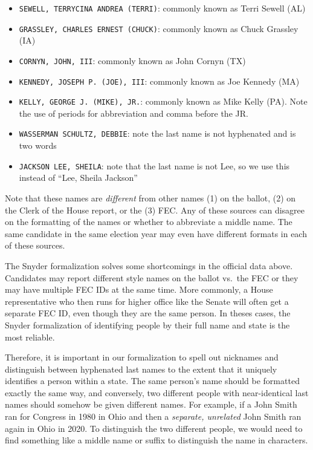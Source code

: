\documentclass[12pt]{article}
\begin{document}
\begin{itemize}
\tightlist
\item
  \texttt{SEWELL,\ TERRYCINA\ ANDREA\ (TERRI)}: commonly known as Terri
  Sewell (AL)
\item
  \texttt{GRASSLEY,\ CHARLES\ ERNEST\ (CHUCK)}: commonly known as Chuck
  Grassley (IA)
\item
  \texttt{CORNYN,\ JOHN,\ III}: commonly known as John Cornyn (TX)
\item
  \texttt{KENNEDY,\ JOSEPH\ P.\ (JOE),\ III}: commonly known as Joe
  Kennedy (MA)
\item
  \texttt{KELLY,\ GEORGE\ J.\ (MIKE),\ JR.}: commonly known as Mike
  Kelly (PA). Note the use of periods for abbreviation and comma before
  the JR.
\item
  \texttt{WASSERMAN\ SCHULTZ,\ DEBBIE}: note the last name is not
  hyphenated and is two words
\item
  \texttt{JACKSON\ LEE,\ SHEILA}: note that the last name is not Lee, so
  we use this instead of ``Lee, Sheila Jackson''
\end{itemize}

Note that these names are \emph{different} from other names (1)
on the ballot, (2) on the Clerk of the House report, or the (3) FEC. Any
of these sources can disagree on the formatting of the names or whether
to abbreviate a middle name. The same candidate in the same election year may
even have different formats in each of these sources.

The Snyder formalization solves some shortcomings in the official data
above. Candidates may report different style names on the ballot vs.~the
FEC or they may have multiple FEC IDs at the same time. More commonly, a
House representative who then runs for higher office like the Senate will
often get a separate FEC ID, even though they are the same person. In
theses cases, the Snyder formalization of identifying people by their full
name and state is the most reliable.

Therefore, it is important in our formalization to spell out nicknames
and distinguish between hyphenated last names to the extent that it
uniquely identifies a person within a state. The same person's name
should be formatted exactly the same way, and conversely, two different
people with near-identical last names should somehow be given
{different} names. For example, if a John Smith ran for Congress
in 1980 in Ohio and then a \emph{separate, unrelated} John Smith ran
again in Ohio in 2020. To distinguish the two different people, we
would need to find {something} like a middle name or suffix to
distinguish the name in characters.
\end{document}
